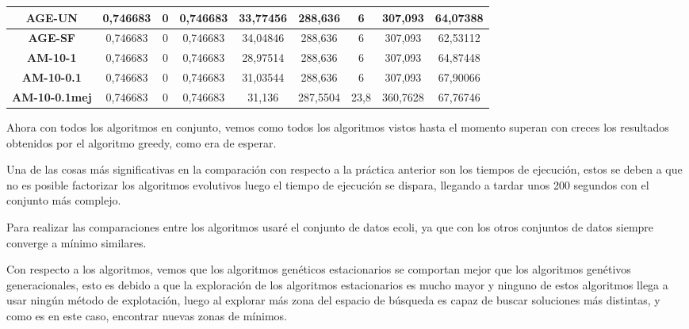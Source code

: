 \documentclass[12pt, spanish]{article}
\begin{document}
\begin{table}[H]
\begin{tabular}{|c|c|c|c|c|c|c|c|c|}
\textbf{AGE-UN}       & 0,746683                  & 0                           & 0,746683               & 33,77456   & 288,636                   & 6                           & 307,093                & 64,07388   \\ \hline
\textbf{AGE-SF}       & 0,746683                  & 0                           & 0,746683               & 34,04846   & 288,636                   & 6                           & 307,093                & 62,53112   \\ \hline
\textbf{AM-10-1}      & 0,746683                  & 0                           & 0,746683               & 28,97514   & 288,636                   & 6                           & 307,093                & 64,87448   \\ \hline
\textbf{AM-10-0.1}    & 0,746683                  & 0                           & 0,746683               & 31,03544   & 288,636                   & 6                           & 307,093                & 67,90066   \\ \hline
\textbf{AM-10-0.1mej} & 0,746683                  & 0                           & 0,746683               & 31,136     & 287,5504                  & 23,8                        & 360,7628               & 67,76746   \\ \hline
\end{tabular}
\end{table}


Ahora con todos los algoritmos en conjunto, vemos como todos los algoritmos vistos hasta el momento superan con creces los resultados obtenidos por el algoritmo greedy, como era de esperar.

Una de las cosas más significativas en la comparación con respecto a la práctica anterior son los tiempos de ejecución, estos se deben a que no es posible factorizar los algoritmos evolutivos luego el tiempo de ejecución se dispara, llegando a tardar unos 200 segundos con el conjunto más complejo.

Para realizar las comparaciones entre los algoritmos usaré el conjunto de datos ecoli, ya que con los otros conjuntos de datos siempre converge a mínimo similares.

Con respecto a los algoritmos, vemos que los algoritmos genéticos estacionarios se comportan mejor que los algoritmos genétivos generacionales, esto es debido a que la exploración de los algoritmos estacionarios es mucho mayor y ninguno de estos algoritmos llega a usar ningún método de explotación, luego al explorar más zona del espacio de búsqueda es capaz de buscar soluciones más distintas, y como es en este caso, encontrar nuevas zonas de mínimos.
\end{document}
